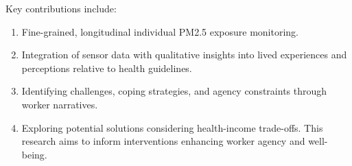 
Key contributions include:
\begin{enumerate}
    \item 
Fine-grained, longitudinal individual PM2.5 exposure monitoring.
    \item 
Integration of sensor data with qualitative insights into lived experiences and perceptions relative to health guidelines.
    \item 
Identifying challenges, coping strategies, and agency constraints through worker narratives.
    \item 
Exploring potential solutions considering health-income trade-offs. This research aims to inform interventions enhancing worker agency and well-being.
\end{enumerate}

